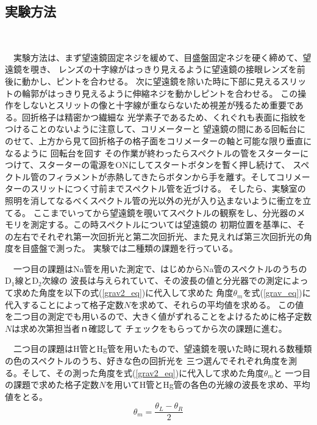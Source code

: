 \documentclass[a4paper,10pt]{jarticle}
\begin{document}
\subsection{実験方法}
　
%

　実験方法は、まず望遠鏡固定ネジを緩めて、目盛盤固定ネジを硬く締めて、望遠鏡を覗き、
レンズの十字線がはっきり見えるように望遠鏡の接眼レンズを前後に動かし、ピントを合わせる。
次に望遠鏡を除いた時に下部に見えるスリットの輪郭がはっきり見えるように伸縮ネジを動かしピントを合わせる。
この操作をしないとスリットの像と十字線が重ならないため視差が残るため重要である。回折格子は精密かつ繊細な
光学素子であるため、くれぐれも表面に指紋をつけることのないように注意して、コリメーターと
望遠鏡の間にある回転台にのせて、上方から見て回折格子の格子面をコリメーターの軸と可能な限り垂直になるように
回転台を回す
その作業が終わったらスペクトルの管をスターターにつけて、スターターの電源をONにしてスタートボタンを暫く押し続けて、
スペクトル管のフィラメントが赤熱してきたらボタンから手を離す。そしてコリメーターのスリットにつく寸前までスペクトル管を近づける。
そしたら、実験室の照明を消してなるべくスペクトル管の光以外の光が入り込まないように衝立を立てる。
ここまでいってから望遠鏡を覗いてスペクトルの観察をし、分光器のメモリを測定する。この時スペクトルについては望遠鏡の
初期位置を基準に、その左右でそれぞれ第一次回折光と第二次回折光、また見えれば第三次回折光の角度を目盛盤で測った。
実験では二種類の課題を行っている。

　一つ目の課題はNa管を用いた測定で、はじめからNa管のスペクトルのうちのD$_1$線とD$_2$次線の
波長は与えられていて、その波長の値と分光器での測定によって求めた角度を以下の式(\ref{grav2_eq})に代入して求めた
角度$\theta_m$を式(\ref{grav_eq})に代入することによって格子定数$N$を求めて、それらの平均値を求める。
この値を二つ目の測定でも用いるので、大きく値がずれることをよけるために格子定数$N$は求め次第担当者ｎ確認して
チェックをもらってから次の課題に進む。

　二つ目の課題はH管とHg管を用いたもので、望遠鏡を覗いた時に現れる数種類の色のスペクトルのうち、好きな色の回折光を
三つ選んでそれぞれ角度を測る。そして、その測った角度を式(\ref{grav2_eq})に代入して求めた角度$\theta_m$と
一つ目の課題で求めた格子定数$N$を用いてH管とHg管の各色の光線の波長を求め、平均値をとる。
\begin{equation}
\theta_m=\frac{\theta_L-\theta_R}{2}
\end{equation}
\vspace{3mm}
\hrulefill

%


\hrulefill
\end{document}
